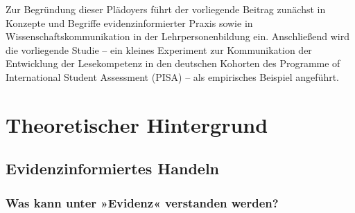 \documentclass[
  jou,
  floatsintext,
  longtable,
  nolmodern,
  notxfonts,
  notimes,
  colorlinks=true,linkcolor=blue,citecolor=blue,urlcolor=blue]{apa7}
\begin{document}
Zur Begründung dieser Plädoyers führt der vorliegende Beitrag zunächst
in Konzepte und Begriffe evidenzinformierter Praxis sowie in
Wissenschaftskommunikation in der Lehrpersonenbildung ein. Anschließend
wird die vorliegende Studie -- ein kleines Experiment zur Kommunikation
der Entwicklung der Lesekompetenz in den deutschen Kohorten des
Programme of International Student Assessment (PISA) -- als empirisches
Beispiel angeführt.

\section{Theoretischer Hintergrund}\label{theoretischer-hintergrund}

\subsection{Evidenzinformiertes
Handeln}\label{evidenzinformiertes-handeln}

\subsubsection{Was kann unter »Evidenz« verstanden
werden?}\label{was-kann-unter-evidenz-verstanden-werden}
\end{document}

